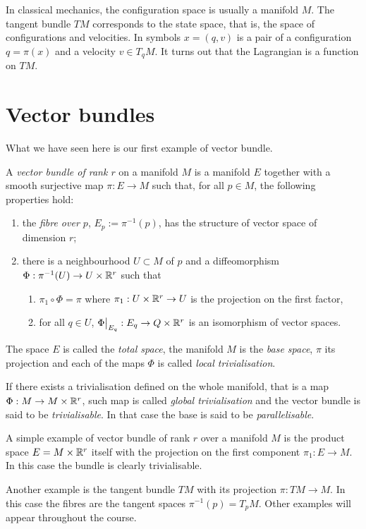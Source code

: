 \begin{remark}
  In classical mechanics, the configuration space is usually a manifold $M$.
  The tangent bundle $TM$ corresponds to the state space, that is, the space of configurations and velocities. In symbols $x=(q,v)$ is a pair of a configuration $q = \pi(x)$ and a velocity $v\in T_q M$.
  It turns out that the Lagrangian is a function on $TM$.
\end{remark}

\section{Vector bundles}\label{sec:vectorbundle}

What we have seen here is our first example of vector bundle.

\begin{definition}\label{def:vector_bundle}
  A \emph{vector bundle of rank $r$} on a manifold $M$ is a manifold $E$ together with a smooth surjective map $\pi : E \to M$ such that, for all $p\in M$, the following properties hold:
  \begin{enumerate}
    \item the \emph{fibre over $p$}, $E_p := \pi^{-1}(p)$, has the structure of vector space of dimension $r$;
    \item there is a neighbourhood $U\subset M$ of $p$ and a diffeomorphism $\Phi: \pi^{-1}(U) \to U \times \mathbb{R}^r$ such that
    \begin{enumerate}
      \item $\pi_1 \circ \Phi = \pi$ where $\pi_1: U\times\mathbb{R}^r\to U$ is the projection on the first factor,
      \item for all $q\in U$, $\Phi\big|_{E_q} : E_q \to Q\times \mathbb{R}^r$ is an isomorphism of vector spaces.
    \end{enumerate}
  \end{enumerate}

  The space $E$ is called the \emph{total space}, the manifold $M$ is the \emph{base space}, $\pi$ its projection and each of the maps $\Phi$ is called \emph{local trivialisation}.

  If there exists a trivialisation defined on the whole manifold, that is a map $\Phi: M \to M\times \mathbb{R}^r$, such map is called \emph{global trivialisation} and the vector bundle is said to be \emph{trivialisable}. In that case the base is said to be \emph{parallelisable}.
\end{definition}

\begin{example}
  A simple example of vector bundle of rank $r$ over a manifold $M$ is the product space $E = M\times \mathbb{R}^r$ itself with the projection on the first component $\pi_1: E\to M$.
  In this case the bundle is clearly trivialisable.
  
  Another example is the tangent bundle $TM$ with its projection $\pi:TM\to M$.
  In this case the fibres are the tangent spaces $\pi^{-1}(p) = T_pM$. 
  Other examples will appear throughout the course.
\end{example}

